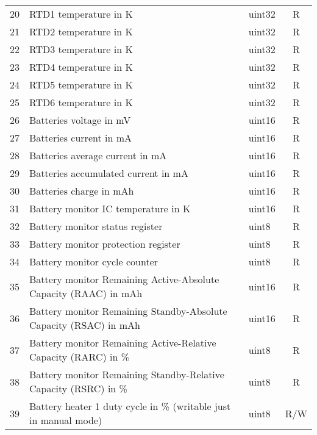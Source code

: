 \begin{longtable}[c]{cL{0.72\textwidth}lc}
    20  & RTD1 temperature in K                                             & uint32 & R \\
    21  & RTD2 temperature in K                                             & uint32 & R \\
    22  & RTD3 temperature in K                                             & uint32 & R \\
    23  & RTD4 temperature in K                                             & uint32 & R \\
    24  & RTD5 temperature in K                                             & uint32 & R \\
    25  & RTD6 temperature in K                                             & uint32 & R \\
    26  & Batteries voltage in mV                                           & uint16 & R \\
    27  & Batteries current in mA                                           & uint16 & R \\
    28  & Batteries average current in mA                                   & uint16 & R \\
    29  & Batteries accumulated current in mA                               & uint16 & R \\
    30  & Batteries charge in mAh                                           & uint16 & R \\
    31  & Battery monitor IC temperature in K                               & uint16 & R \\
    32  & Battery monitor status register                                   & uint8  & R \\
    33  & Battery monitor protection register                               & uint8  & R \\
    34  & Battery monitor cycle counter                                     & uint8  & R \\
    35  & Battery monitor Remaining Active-Absolute Capacity (RAAC) in mAh  & uint16 & R \\
    36  & Battery monitor Remaining Standby-Absolute Capacity (RSAC) in mAh & uint16 & R \\
    37  & Battery monitor Remaining Active-Relative Capacity (RARC) in \%   & uint8  & R \\
    38  & Battery monitor Remaining Standby-Relative Capacity (RSRC) in \%  & uint8  & R \\
    39  & Battery heater 1 duty cycle in \% (writable just in manual mode)  & uint8  & R/W \\

\end{longtable}
